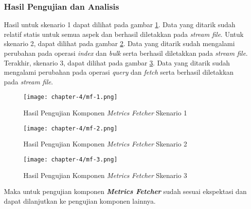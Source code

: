 \subsubsection{Hasil Pengujian dan Analisis}

Hasil untuk skenario 1 dapat dilihat pada gambar \ref{fig:mf-1}. Data yang ditarik sudah relatif statis untuk semua aspek dan berhasil diletakkan pada \textit{stream file}. Untuk skenario 2, dapat dilihat pada gambar \ref{fig:mf-2}. Data yang ditarik sudah mengalami perubahan pada operasi \textit{index} dan \textit{bulk} serta berhasil diletakkan pada \textit{stream file}. Terakhir, skenario 3, dapat dilihat pada gambar \ref{fig:mf-3}. Data yang ditarik sudah mengalami perubahan pada operasi \textit{query} dan \textit{fetch} serta berhasil diletakkan pada \textit{stream file}.

\begin{figure}[h]
    \centering
    \texttt{[image: chapter-4/mf-1.png]}
    \caption{Hasil Pengujian Komponen \textit{Metrics Fetcher} Skenario 1}
    \label{fig:mf-1}
\end{figure}

\begin{figure}[h]
    \centering
    \texttt{[image: chapter-4/mf-2.png]}
    \caption{Hasil Pengujian Komponen \textit{Metrics Fetcher} Skenario 2}
    \label{fig:mf-2}
\end{figure}

\begin{figure}[h]
    \centering
    \texttt{[image: chapter-4/mf-3.png]}
    \caption{Hasil Pengujian Komponen \textit{Metrics Fetcher} Skenario 3}
    \label{fig:mf-3}
\end{figure}

Maka untuk pengujian komponen \textbf{\textit{Metrics Fetcher}} sudah sesuai ekspektasi dan dapat dilanjutkan ke pengujian komponen lainnya.